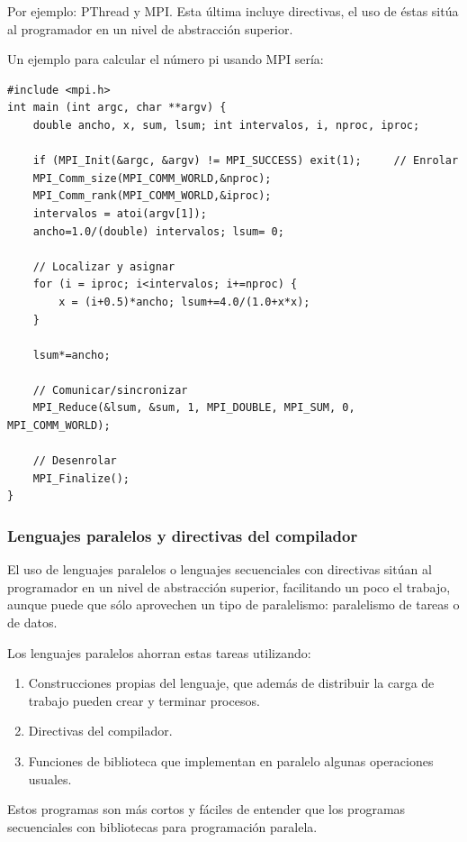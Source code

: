 \documentclass[10pt,a4paper,spanish]{report}
\begin{document}
Por ejemplo: PThread y MPI. Esta última incluye directivas, el uso de éstas sitúa al programador en un nivel de abstracción superior.

Un ejemplo para calcular el número pi usando MPI sería:
\begin{verbatim}
#include <mpi.h>
int main (int argc, char **argv) {
    double ancho, x, sum, lsum; int intervalos, i, nproc, iproc;

    if (MPI_Init(&argc, &argv) != MPI_SUCCESS) exit(1);     // Enrolar
    MPI_Comm_size(MPI_COMM_WORLD,&nproc);
    MPI_Comm_rank(MPI_COMM_WORLD,&iproc);
    intervalos = atoi(argv[1]);
    ancho=1.0/(double) intervalos; lsum= 0;

    // Localizar y asignar
    for (i = iproc; i<intervalos; i+=nproc) {
        x = (i+0.5)*ancho; lsum+=4.0/(1.0+x*x);
    }

    lsum*=ancho;

    // Comunicar/sincronizar
    MPI_Reduce(&lsum, &sum, 1, MPI_DOUBLE, MPI_SUM, 0, MPI_COMM_WORLD);

    // Desenrolar
    MPI_Finalize();
}    
\end{verbatim}

\textcolor[rgb]{0.2,0.4,0.8}{\subsubsection{Lenguajes paralelos y directivas del compilador}}
El uso de lenguajes paralelos o lenguajes secuenciales con directivas sitúan al programador en un nivel de abstracción superior, facilitando un poco el trabajo, aunque puede que sólo aprovechen un tipo de paralelismo: paralelismo de tareas o de datos. 

Los lenguajes paralelos ahorran estas tareas utilizando:
\begin{enumerate}[\color{azul}{\bf $\heartsuit$}]
    \item Construcciones propias del lenguaje, que además de distribuir la carga de trabajo pueden crear y terminar procesos.
    \item Directivas del compilador.
    \item Funciones de biblioteca que implementan en paralelo algunas operaciones usuales.
\end{enumerate}

Estos programas son más cortos y fáciles de entender que los programas secuenciales con bibliotecas para programación paralela.
\end{document}
